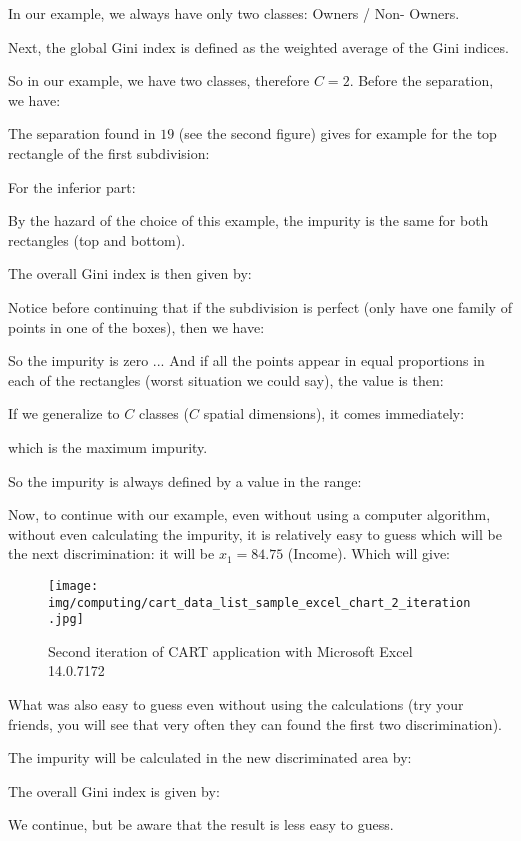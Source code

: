 	In our example, we always have only two classes: Owners / Non- Owners.

	Next, the global Gini index is defined as the weighted average of the Gini indices.

	So in our example, we have two classes, therefore $C=2$. Before the separation, we have:
	
	The separation found in $19$ (see the second figure) gives for example for the top rectangle of the first subdivision:
	
	For the inferior part:
	
	By the hazard of the choice of this example, the impurity is the same for both rectangles (top and bottom).

	The overall Gini index is then given by:
	
	Notice before continuing that if the subdivision is perfect (only have one family of points in one of the boxes), then we have:
	
	So the impurity is zero ... And if all the points appear in equal proportions in each of the rectangles (worst situation we could say), the value is then:
	
	If we generalize to $C$ classes ($C$ spatial dimensions), it comes immediately:
	
	which is the maximum impurity.

	So the impurity is always defined by a value in the range:
	
	Now, to continue with our example, even without using a computer algorithm, without even calculating the impurity, it is relatively easy to guess which will be the next discrimination: it will be $x_1=84.75$ (Income). Which will give:
	\begin{figure}[H]
		\centering
		\texttt{[image: img/computing/cart\_data\_list\_sample\_excel\_chart\_2\_iteration.jpg]}
		\caption[]{Second iteration of CART application with Microsoft Excel 14.0.7172}
	\end{figure}
	What was also easy to guess even without using the calculations (try your friends, you will see that very often they can found the first two discrimination).

	The impurity will be calculated in the new discriminated area by:
	
	The overall Gini index is given by:
	
	We continue, but be aware that the result is less easy to guess. 

